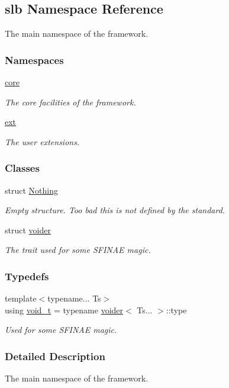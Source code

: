 \hypertarget{namespaceslb}{}\subsection{slb Namespace Reference}
\label{namespaceslb}


The main namespace of the framework.  


\subsubsection*{Namespaces}
\begin{DoxyCompactItemize}
\item 
 \hyperlink{namespaceslb_1_1core}{core}
\begin{DoxyCompactList}\small\item\em The core facilities of the framework. \end{DoxyCompactList}\item 
 \hyperlink{namespaceslb_1_1ext}{ext}
\begin{DoxyCompactList}\small\item\em The user extensions. \end{DoxyCompactList}\end{DoxyCompactItemize}
\subsubsection*{Classes}
\begin{DoxyCompactItemize}
\item 
struct \hyperlink{structslb_1_1Nothing}{Nothing}
\begin{DoxyCompactList}\small\item\em Empty structure. Too bad this is not defined by the standard. \end{DoxyCompactList}\item 
struct \hyperlink{structslb_1_1voider}{voider}
\begin{DoxyCompactList}\small\item\em The trait used for some S\+F\+I\+N\+AE magic. \end{DoxyCompactList}\end{DoxyCompactItemize}
\subsubsection*{Typedefs}
\begin{DoxyCompactItemize}
\item 
{\footnotesize template$<$typename... Ts$>$ }\\using \hyperlink{namespaceslb_a6db7857edf482d41f59c7602b4620a22}{void\+\_\+t} = typename \hyperlink{structslb_1_1voider}{voider}$<$ Ts... $>$\+::type\hypertarget{namespaceslb_a6db7857edf482d41f59c7602b4620a22}{}\label{namespaceslb_a6db7857edf482d41f59c7602b4620a22}

\begin{DoxyCompactList}\small\item\em Used for some S\+F\+I\+N\+AE magic. \end{DoxyCompactList}\end{DoxyCompactItemize}


\subsubsection{Detailed Description}
The main namespace of the framework. 